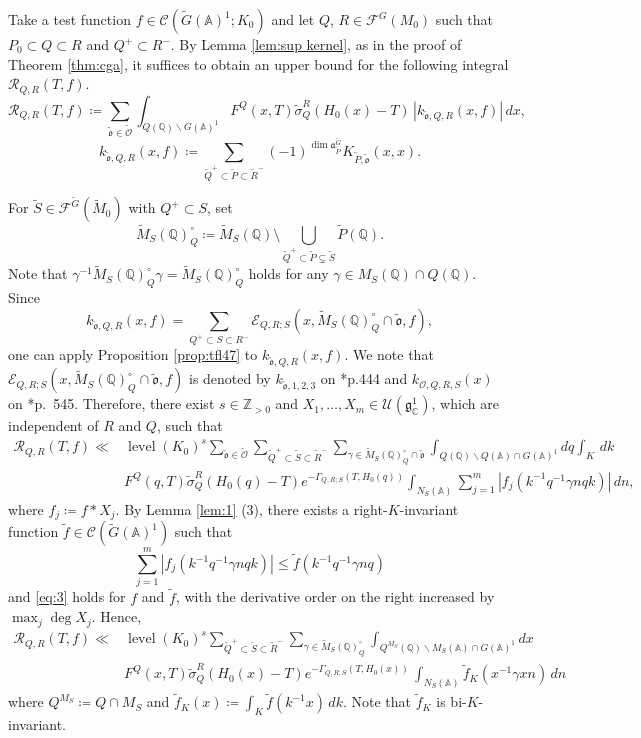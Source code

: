 \documentclass[12pt]{amsart}
\theoremstyle{definition}
\theoremstyle{plain}
\theoremstyle{remark}
\def\C{\mathbb{C}}%
\def\Q{\mathbb{Q}}%
\def\Z{\mathbb{Z}}%
\def\A{\mathbb{A}}%
\def\bs{\backslash}%
\newcommand{\fa}{\mathfrak{a}}
\newcommand{\fg}{\mathfrak{g}}
\newcommand{\cC}{\mathcal{C}}
\newcommand{\cE}{\mathcal{E}}
\newcommand{\cF}{\mathcal{F}}
\newcommand{\cR}{\mathcal{R}}
\newcommand{\cU}{\mathcal{U}}
\numberwithin{equation}{section}
\newcommand{\tG}{\widetilde{G}}
\newcommand{\tM}{\widetilde{M}}
\newcommand{\tP}{\widetilde{P}}
\newcommand{\tQ}{\widetilde{Q}}
\newcommand{\tR}{\widetilde{R}}
\newcommand{\tS}{\widetilde{S}}
\newcommand{\tfo}{\widetilde{\mathfrak{o}}}
\newcommand{\tcO}{\widetilde{\mathcal{O}}}
\newcommand{\tf}{\tilde{f}}
\newcommand{\level}{\operatorname{level}}
\begin{document}
Take a test function $f\in \cC(\tG(\A)^1;K_0)$ and let $Q$, $R\in\cF^G(M_0)$ such that $P_0\subset Q\subset R$ and $Q^+\subset R^-$. 
By Lemma \ref{lem:sup kernel}, as in the proof of Theorem \ref{thm:cga}, %
it suffices to obtain an upper bound for the following integral $\cR_{Q,R}(T,f)$. 
\[
 \cR_{Q,R}(T,f)
  \coloneqq\sum_{\tfo\in\tcO}\int_{Q(\Q)\bs G(\A)^1}
      F^Q(x,T)\widetilde\sigma_Q^R(H_0(x)-T)
      \, | k_{\tfo,Q,R}(x,f)|\,dx,
\]
\[
 k_{\tfo,Q,R}(x,f)
   \coloneqq \sum_{\tQ^+\subset \tP\subset \tR^-}
        (-1)^{\dim\fa_{\tP}^{\tG}} K_{\tP,\tfo}(x,x).
\]



For $\tS\in\cF^{\tG}(\tM_0)$ with $Q^+\subset S$, set
\[
 \tM_S(\Q)_{Q}^{\circ}
   \coloneqq \tM_S(\Q)\setminus
       \bigcup_{\tQ^+\subset \tP\subsetneq \tS}\tP(\Q).
\]
Note that $\gamma^{-1}\tM_S(\Q)_{Q}^{\circ}\gamma=\tM_S(\Q)_{Q}^{\circ}$ holds for any $\gamma\in M_{S}(\Q)\cap Q(\Q)$. 
Since 
\[
k_{\tfo,Q,R}(x,f)=\sum_{Q^+\subset S\subset R^-}\cE_{Q,R;S}(x,\tM_S(\Q)_{Q}^{\circ}\cap\tfo,f),
\]
one can apply Proposition \ref{prop:tfl47} to $k_{\tfo,Q,R}(x,f)$. 
We note that $\cE_{Q,R;S}(x,\tM_S(\Q)_{Q}^{\circ}\cap\tfo,f)$ is denoted by 
$k_{\tfo,1,2,3}$ on \cite{FL16}*{p.444} and $k_{\mathscr{O},Q,R,S}(x)$ on \cite{Par19}*{p.~545}.
Therefore, %
there exist $s\in\Z_{>0}$ and $X_1,\dots,X_m\in\cU(\fg_\C^1)$, which are independent of $R$ and $Q$, such that
\begin{align*}
\cR_{Q,R}(T,f)\ll& \level(K_0)^s\sum_{\tfo\in\tcO} \sum_{\tQ^+\subset\tS \subset \tR^-}\sum_{\gamma\in \tM_S(\Q)_{Q}^{\circ}\cap\tfo} \int_{Q(\Q)\bs Q(\A)\cap G(\A)^1}dq \int_K \, dk  \\  
      & F^Q(q,T)\widetilde\sigma_Q^R(H_0(q)-T)  e^{-\Gamma_{Q,R;S}(T,H_0(q))} \int_{N_{S}(\A)} \sum_{j=1}^m|f_j(k^{-1}q^{-1}\gamma nqk)|\,dn,
\end{align*}
where $f_j\coloneqq f*X_j$.
By Lemma \ref{lem:1} (3), there exists a right-$K$-invariant function $\tf\in \cC(\tG(\A)^1)$ such that 
\[
\sum_{j=1}^m|f_j(k^{-1}q^{-1}\gamma nqk)|\le \tf(k^{-1}q^{-1}\gamma nq)
\]
and \eqref{eq:3} holds for $f$ and $\widetilde f$, with the derivative order on the right increased by $\max_j\deg X_j$.
Hence, 
\begin{align*}
\cR_{Q,R}(T,f)\ll& \level(K_0)^s \sum_{\tQ^+\subset\tS \subset \tR^-}\sum_{\gamma\in \tM_S(\Q)_{Q}^{\circ}} \int_{Q^{M_S}(\Q)\bs M_S(\A)\cap G(\A)^1}dx   \\  
      & F^Q(x,T)\widetilde\sigma_Q^R(H_0(x)-T)  e^{-\Gamma_{Q,R;S}(T,H_0(x))}\, \int_{N_{S}(\A)}\tf_{K}(x^{-1}\gamma xn)\, dn \nonumber
\end{align*}
where $Q^{M_S}\coloneqq Q\cap M_S$ and $\tf_{K}(x)\coloneqq \int_{K}\tf(k^{-1}x)\, dk$. 
Note that $\tf_{K}$ is bi-$K$-invariant. 
\end{document}
